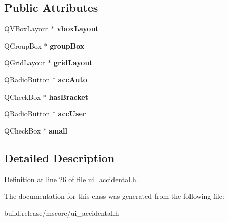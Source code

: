 \subsection*{Public Attributes}
\begin{DoxyCompactItemize}
\item 
\mbox{\label{class_ui___accidental_a5dc0f3669505de11349c18c8151b9636}} 
Q\+V\+Box\+Layout $\ast$ {\bfseries vbox\+Layout}
\item 
\mbox{\label{class_ui___accidental_a259b497f2ac5a4e22c35fa03a4a16e26}} 
Q\+Group\+Box $\ast$ {\bfseries group\+Box}
\item 
\mbox{\label{class_ui___accidental_aeed6a0c62d804bb7f49b654c62356a21}} 
Q\+Grid\+Layout $\ast$ {\bfseries grid\+Layout}
\item 
\mbox{\label{class_ui___accidental_ae840f955d09a84141447808011ace6a0}} 
Q\+Radio\+Button $\ast$ {\bfseries acc\+Auto}
\item 
\mbox{\label{class_ui___accidental_a05ebbab9925ab2a5837013e5c3660d47}} 
Q\+Check\+Box $\ast$ {\bfseries has\+Bracket}
\item 
\mbox{\label{class_ui___accidental_a9557b5101cdf53e5cd278ff62a777f72}} 
Q\+Radio\+Button $\ast$ {\bfseries acc\+User}
\item 
\mbox{\label{class_ui___accidental_a76edd4ff7bf499287a82dcd4223c8072}} 
Q\+Check\+Box $\ast$ {\bfseries small}
\end{DoxyCompactItemize}


\subsection{Detailed Description}


Definition at line 26 of file ui\+\_\+accidental.\+h.



The documentation for this class was generated from the following file\+:\begin{DoxyCompactItemize}
\item 
build.\+release/mscore/ui\+\_\+accidental.\+h\end{DoxyCompactItemize}
